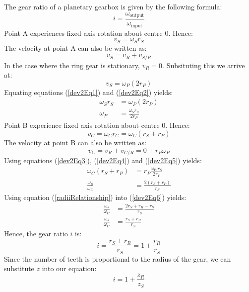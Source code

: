 \documentclass[12pt]{article}
\numberwithin{equation}{section}
\begin{document}
\begin{flushleft}
The gear ratio of a planetary gearbox is given by the following formula:
\begin{equation}
  i = \frac{\omega_{\textrm{output}}}{\omega_{\textrm{input}}}
  \label{gearRatio}
\end{equation}
Point A experiences fixed axis rotation about centre $0$. Hence:
\begin{equation}
  v_S = \omega_S r_S
  \label{dev2Eq1}
\end{equation}
The velocity at point A can also be written as:
\begin{equation}
  v_S = v_R + v_{S/R}
\end{equation}
In the case where the ring gear is stationary, \(v_R = 0\). Subsituting this we arrive at:
\begin{equation}
  v_S = \omega_P(2r_P)
  \label{dev2Eq2}
\end{equation}
Equating equations (\ref{dev2Eq1}) and (\ref{dev2Eq2}) yields:
\begin{align}
  \omega_S r_S &= \omega_P (2r_P)\\
  \omega_P &= \frac{\omega_S r_S}{2r_P} \label{dev2Eq3}
\end{align}
Point B experience fixed axis rotation about centre $0$. Hence: 
\begin{equation}
  v_C = \omega_C r_C = \omega_C (r_S + r_P) \label{dev2Eq4}
\end{equation}
The velocity at point B can also be written as:
\begin{equation}
  v_C = v_R + v_{C/R} = 0 + r_P \omega_P \label{dev2Eq5}
\end{equation}
Using equations (\ref{dev2Eq3}), (\ref{dev2Eq4}) and (\ref{dev2Eq5}) yields:
\begin{align}
  \omega_C (r_S + r_P) &= r_P \frac{\omega_W r_S}{2r_P}\\
  \frac{\omega_S}{\omega_C} &= \frac{2(r_S + r_P)}{r_S} \label{dev2Eq6}
\end{align}
Using equation (\ref{radiiRelationship}) into (\ref{dev2Eq6}) yields:
\begin{align}
  \frac{\omega_s}{\omega_C} &= \frac{2r_S + r_R - r_S}{r_S}\\
  \frac{\omega_s}{\omega_C} &= \frac{r_S + r_R}{r_S}
\end{align}
Hence, the gear ratio $i$ is:
\begin{equation}
  i = \frac{r_S + r_R}{r_S} = 1 + \frac{r_R}{r_S}
\end{equation}
Since the number of teeth is proportional to the radius of the gear, we can substitute $z$ into our equation:
\begin{equation}
  i = 1 + \frac{z_R}{z_S}
\end{equation}

\end{flushleft}
\end{document}
